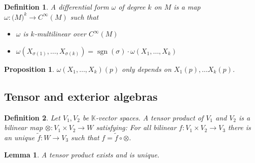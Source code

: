 \documentclass{scrartcl}
\newtheorem*{mydef}{Definition}
\newtheorem*{lemma}{Lemma}
\newtheorem*{prop}{Proposition}
\begin{document}
\begin{mydef}
  A \emph{differential form} $\omega$ of degree $k$ on $M$ is a map $\omega: \mathfrak(M)^k \rightarrow C^\infty(M)$ such that

  \begin{itemize}
  \item $\omega$ is $k$-multilinear over $C^\infty(M)$
  \item $\omega(X_{\sigma(1)}, \ldots, X_{\sigma(k)}) = \operatorname{sgn}(\sigma)\cdot \omega(X_1,\ldots,X_k)$
  \end{itemize}
\end{mydef}

\begin{prop}
  $\omega(X_1,\ldots,X_k)(p)$ only depends on $X_1(p), \ldots X_k(p)$. 
\end{prop}

\subsection{Tensor and exterior algebras}

\begin{mydef}
  Let $V_1,V_2$ be $\mathbb K$-vector spaces. A tensor product of $V_1$ and $V_2$ is a bilinear map $\otimes: V_1 \times V_2 \rightarrow W$ satisfying: For all bilinear $f:V_1\times V_2 \rightarrow V_3$ there is an unique $\tilde f:W\rightarrow V_3$ such that $f = \tilde f \circ \otimes$.
\end{mydef}


\begin{lemma}
  A tensor product exists and is unique.
\end{lemma}
\end{document}
